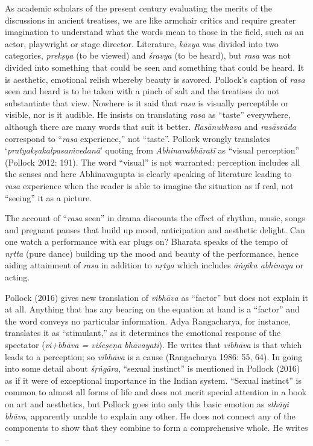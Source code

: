 As academic scholars of the present century evaluating the merits of the discussions in ancient treatises, we are like armchair critics and require greater imagination to understand what the words mean to those in the field, such as an actor, playwright or stage director. Literature, \textit{kāvya }was divided into two categories, \textit{prekṣya} (to be viewed) and \textit{śravya }(to be heard), but \textit{rasa} was not divided into something that could be seen and something that could be heard. It is aesthetic, emotional relish whereby beauty is savored. Pollock’s caption of \textit{rasa} seen and heard is to be taken with a pinch of salt and the treatises do not substantiate that view. Nowhere is it said that \textit{rasa} is visually perceptible or visible, nor is it audible. He insists on translating \textit{rasa} as “taste” everywhere, although there are many words that suit it better. \textit{Rasānubhava} and \textit{rasāsvāda} correspond to “\textit{rasa} experience,” not “taste”. Pollock wrongly translates ‘\textit{pratyakṣakalpasaṁvedanā}’ quoting from \textit{Abhinavabhāratī} as “visual perception” (Pollock 2012: 191). The word “visual” is not warranted: perception includes all the senses and here Abhinavagupta is clearly speaking of literature leading to \textit{rasa} experience when the reader is able to imagine the situation as if real, not “seeing” it as a picture.

The account of “\textit{rasa} seen” in drama discounts the effect of rhythm, music, songs and pregnant pauses that build up mood, anticipation and aesthetic delight. Can one watch a performance with ear plugs on? Bharata speaks of the tempo of \textit{nṛtta} (pure dance) building up the mood and beauty of the performance, hence aiding attainment of \textit{rasa} in addition to \textit{nṛtya} which includes \textit{āṅgika abhinaya} or acting.

Pollock (2016) gives new translation of \textit{vibhāva} as “factor” but does not explain it at all. Anything that has any bearing on the equation at hand is a “factor” and the word conveys no particular information. Adya Rangacharya, for instance, translates it as “stimulant,” as it determines the emotional response of the spectator (\textit{vi+bhāva = viśeṣeṇa bhāvayati}). He writes that \textit{vibhāva} is that which leads to a perception; so \textit{vibhāva} is a cause (Rangacharya 1986: 55, 64). In going into some detail about \textit{śṛṅgāra}, “sexual instinct” is mentioned in Pollock (2016) as if it were of exceptional importance in the Indian system. “Sexual instinct” is common to almost all forms of life and does not merit special attention in a book on art and aesthetics, but Pollock goes into only this basic emotion as \textit{sthāyi bhāva}, apparently unable to explain any other. He does not connect any of the components to show that they combine to form a comprehensive whole. He writes –

